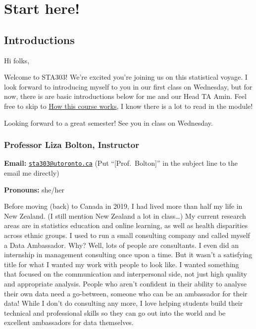 \documentclass[
  openany]{book}
\begin{document}
\hypertarget{start-here}{%
\chapter{Start here!}\label{start-here}}

\hypertarget{introductions}{%
\section{Introductions}\label{introductions}}

Hi folks,

Welcome to STA303! We're excited you're joining us on this statistical voyage. I look forward to introducing myself to you in our first class on Wednesday, but for now, there is are basic introductions below for me and our Head TA Amin. Feel free to skip to \protect\hyperlink{howthiscourseworks}{How this course works}, I know there is a lot to read in the module!

Looking forward to a great semester! See you in class on Wednesday.

\hypertarget{professor-liza-bolton-instructor}{%
\subsection{Professor Liza Bolton, Instructor}\label{professor-liza-bolton-instructor}}

\textbf{Email:} \href{mailto:sta303@utoronto.ca}{\nolinkurl{sta303@utoronto.ca}} (Put ``{[}Prof.~Bolton{]}'' in the subject line to the email me directly)

\textbf{Pronouns:} she/her

Before moving (back) to Canada in 2019, I had lived more than half my life in New Zealand. (I still mention New Zealand a lot in class\ldots) My current research areas are in statistics education and online learning, as well as health disparities across ethnic groups. I used to run a small consulting company and called myself a Data Ambassador. Why? Well, lots of people are consultants. I even did an internship in management consulting once upon a time. But it wasn't a satisfying title for what I wanted my work with people to look like. I wanted something that focused on the communication and interpersonal side, not just high quality and appropriate analysis. People who aren't confident in their ability to analyse their own data need a go-between, someone who can be an ambassador for their data! While I don't do consulting any more, I love helping students build their technical and professional skills so they can go out into the world and be excellent ambassadors for data themselves.
\end{document}
